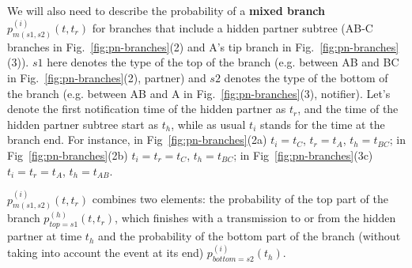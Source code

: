 \documentclass[10pt,letterpaper]{article}
\begin{document}
We will also need to describe the probability of a\textbf{ mixed branch} $p_{m(s1,s2)}^{(i)}(t,t_r)$ for branches that include a hidden partner subtree (AB-C branches in Fig.~\ref{fig:pn-branches}(2) and A's tip branch in Fig.~\ref{fig:pn-branches}(3)). $s1$ here denotes the type of the top of the branch (e.g. between AB and BC in Fig.~\ref{fig:pn-branches}(2), partner) and $s2$ denotes the type of the bottom of the branch (e.g. between AB and A in Fig.~\ref{fig:pn-branches}(3), notifier). Let's denote the first notification time of the hidden partner as $t_r$, and the time of the hidden partner subtree start as $t_h$, while as usual $t_i$ stands for the time at the branch end.  For instance, in Fig~\ref{fig:pn-branches}(2a) $t_i=t_C$, $t_r=t_A$, $t_h=t_{BC}$; in Fig~\ref{fig:pn-branches}(2b) $t_i=t_r=t_C$, $t_h=t_{BC}$; in Fig~\ref{fig:pn-branches}(3c) $t_i=t_r=t_A$, $t_h=t_{AB}$. 

$p_{m(s1,s2)}^{(i)}(t,t_r)$ combines two elements: the probability of the top part of the branch $p_{top=s1}^{(h)}(t, t_r)$, which finishes with a transmission to or from the hidden partner at time $t_h$ and the probability of the bottom part of the branch (without taking into account the event at its end) $p_{bottom=s2}^{(i)}(t_h)$.
\end{document}
